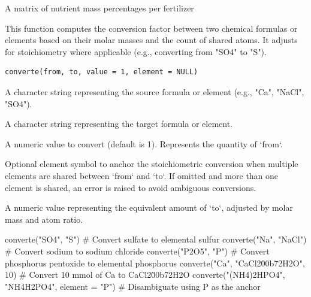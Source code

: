 \documentclass[a4paper]{book}
\begin{document}
%
\begin{Value}
A matrix of nutrient mass percentages per fertilizer
\end{Value}
%
\begin{Description}
This function computes the conversion factor between two chemical formulas or elements
based on their molar masses and the count of shared atoms. It adjusts for stoichiometry
where applicable (e.g., converting from "SO4" to "S").
\end{Description}
%
\begin{Usage}
\begin{verbatim}
converte(from, to, value = 1, element = NULL)
\end{verbatim}
\end{Usage}
%
\begin{Arguments}
\begin{ldescription}
\item[\code{from}] A character string representing the source formula or element (e.g., "Ca", "NaCl", "SO4").

\item[\code{to}] A character string representing the target formula or element.

\item[\code{value}] A numeric value to convert (default is 1). Represents the quantity of `from`.

\item[\code{element}] Optional element symbol to anchor the stoichiometric conversion when
multiple elements are shared between `from` and `to`. If omitted and more than one
element is shared, an error is raised to avoid ambiguous conversions.
\end{ldescription}
\end{Arguments}
%
\begin{Value}
A numeric value representing the equivalent amount of `to`, adjusted by molar mass and atom ratio.
\end{Value}
%
\begin{Examples}
\begin{ExampleCode}
converte("SO4", "S")        # Convert sulfate to elemental sulfur
converte("Na", "NaCl")      # Convert sodium to sodium chloride
converte("P2O5", "P")       # Convert phosphorus pentoxide to elemental phosphorus
converte("Ca", "CaCl2\u00b72H2O", 10)  # Convert 10 mmol of Ca to CaCl2\u00b72H2O
converte("(NH4)2HPO4", "NH4H2PO4", element = "P")  # Disambiguate using P as the anchor

\end{ExampleCode}
\end{Examples}
\end{document}
